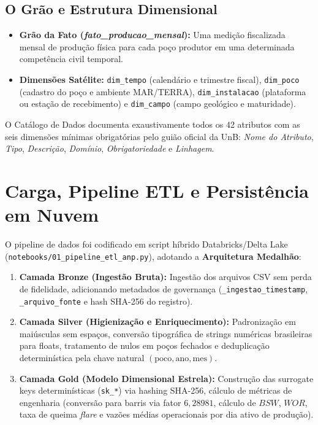 \documentclass[12pt,a4paper]{article}
\begin{document}
\subsection{O Grão e Estrutura Dimensional}
\begin{itemize}[leftmargin=*]
    \item \textbf{Grão da Fato (\textit{fato\_producao\_mensal}):} Uma medição fiscalizada mensal de produção física para cada poço produtor em uma determinada competência civil temporal.
    \item \textbf{Dimensões Satélite:} \texttt{dim\_tempo} (calendário e trimestre fiscal), \texttt{dim\_poco} (cadastro do poço e ambiente MAR/TERRA), \texttt{dim\_instalacao} (plataforma ou estação de recebimento) e \texttt{dim\_campo} (campo geológico e maturidade).
\end{itemize}

O Catálogo de Dados documenta exaustivamente todos os 42 atributos com as seis dimensões mínimas obrigatórias pelo guião oficial da UnB: \textit{Nome do Atributo}, \textit{Tipo}, \textit{Descrição}, \textit{Domínio}, \textit{Obrigatoriedade} e \textit{Linhagem}.

\section{Carga, Pipeline ETL e Persistência em Nuvem}

O pipeline de dados foi codificado em script híbrido Databricks/Delta Lake (\texttt{notebooks/01\_pipeline\_etl\_anp.py}), adotando a \textbf{Arquitetura Medalhão}:
\begin{enumerate}
    \item \textbf{Camada Bronze (Ingestão Bruta):} Ingestão dos arquivos CSV sem perda de fidelidade, adicionando metadados de governança (\texttt{\_ingestao\_timestamp}, \texttt{\_arquivo\_fonte} e hash SHA-256 do registro).
    \item \textbf{Camada Silver (Higienização e Enriquecimento):} Padronização em maiúsculas sem espaços, conversão tipográfica de strings numéricas brasileiras para floats, tratamento de nulos em poços fechados e deduplicação determinística pela chave natural $(\text{poco}, \text{ano}, \text{mes})$.
    \item \textbf{Camada Gold (Modelo Dimensional Estrela):} Construção das surrogate keys determinísticas (\texttt{sk\_*}) via hashing SHA-256, cálculo de métricas de engenharia (conversão para barris via fator $6,28981$, cálculo de $BSW$, $WOR$, taxa de queima \textit{flare} e vazões médias operacionais por dia ativo de produção).
\end{enumerate}
\end{document}
